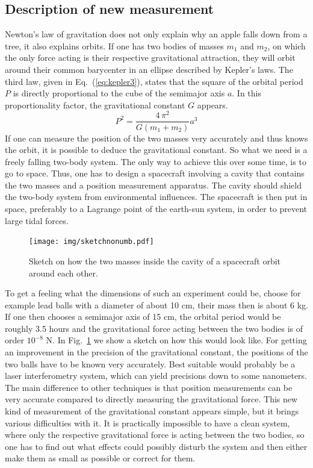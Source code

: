 \documentclass[prb,preprint]{revtex4-1}
\begin{document}
\subsection{Description of new measurement}
Newton's law of gravitation does not only explain why an apple falls down from a tree, it also explains orbits. If one has two bodies of masses $m_1$ and $m_2$, on which the only force acting is their respective gravitational attraction, they will orbit around their common barycenter in an ellipse described by Kepler's laws. The third law, given in Eq.~(\ref{eq:kepler3}), states that the square of the orbital period $P$ is directly proportional to the cube of the semimajor axis $a$. In this proportionality factor, the gravitational constant $G$ appears.
\begin{equation}\label{eq:kepler3}
P^2 = \frac{4 \, \pi^2}{G(m_1+m_2)}a^3
\end{equation}
If one can measure the position of the two masses very accurately and thus knows the orbit, it is possible to deduce the gravitational constant. 
So what we need is a freely falling two-body system. The only way to achieve this over some time, is to go to space. Thus, one has to design a spacecraft involving a cavity that contains the two masses and a position measurement apparatus. The cavity should shield the two-body system from environmental influences. The spacecraft is then put in space, preferably to a Lagrange point of the earth-sun system, in order to prevent large tidal forces.\\

\begin{figure}
	\centering
	\texttt{[image: img/sketchnonumb.pdf]}
	\caption{Sketch on how the two masses inside the cavity of a spacecraft orbit around each other.}
	\label{fig:sketch}
\end{figure}

To get a feeling what the dimensions of such an experiment could be, choose for example lead balls with a diameter of about 10 cm, their mass then is about 6 kg. If one then chooses a semimajor axis of 15 cm, the orbital period would be roughly 3.5 hours and the gravitational force acting between the two bodies is of order $10^{-8}$ N. In Fig.~\ref{fig:sketch} we show a sketch on how this would look like.
For getting an improvement in the precision of the gravitational constant, the positions of the two balls have to be known very accurately. Best suitable would probably be a laser interferometry system, which can yield precisions down to some nanometers.\cite{Loughridge13}
The main difference to other techniques is that position measurements can be very accurate compared to directly measuring the gravitational force.
This new kind of measurement of the gravitational constant appears simple, but it brings various difficulties with it. It is practically impossible to have a clean system, where only the respective gravitational force is acting between the two bodies, so one has to find out what effects could possibly disturb the system and then either make them as small as possible or correct for them. \\
\end{document}

